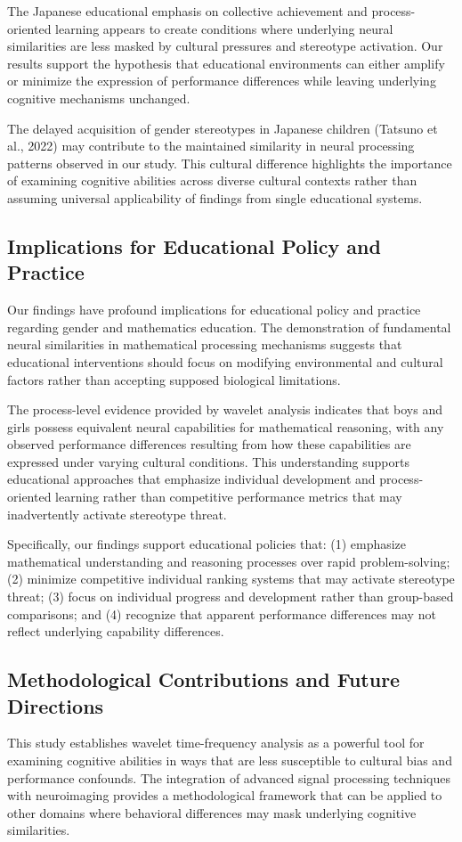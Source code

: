 \documentclass[pdflatex,reference]{sn-jnl}%
\theoremstyle{thmstyleone}%
\theoremstyle{thmstyletwo}%
\theoremstyle{thmstylethree}%
\begin{document}
The Japanese educational emphasis on collective achievement and process-oriented learning appears to create conditions where underlying neural similarities are less masked by cultural pressures and stereotype activation. Our results support the hypothesis that educational environments can either amplify or minimize the expression of performance differences while leaving underlying cognitive mechanisms unchanged.

The delayed acquisition of gender stereotypes in Japanese children (Tatsuno et al., 2022) may contribute to the maintained similarity in neural processing patterns observed in our study. This cultural difference highlights the importance of examining cognitive abilities across diverse cultural contexts rather than assuming universal applicability of findings from single educational systems.


\subsection{Implications for Educational Policy and Practice}
Our findings have profound implications for educational policy and practice regarding gender and mathematics education. The demonstration of fundamental neural similarities in mathematical processing mechanisms suggests that educational interventions should focus on modifying environmental and cultural factors rather than accepting supposed biological limitations.

The process-level evidence provided by wavelet analysis indicates that boys and girls possess equivalent neural capabilities for mathematical reasoning, with any observed performance differences resulting from how these capabilities are expressed under varying cultural conditions. This understanding supports educational approaches that emphasize individual development and process-oriented learning rather than competitive performance metrics that may inadvertently activate stereotype threat.

Specifically, our findings support educational policies that: (1) emphasize mathematical understanding and reasoning processes over rapid problem-solving; (2) minimize competitive individual ranking systems that may activate stereotype threat; (3) focus on individual progress and development rather than group-based comparisons; and (4) recognize that apparent performance differences may not reflect underlying capability differences.


\subsection{Methodological Contributions and Future Directions}
This study establishes wavelet time-frequency analysis as a powerful tool for examining cognitive abilities in ways that are less susceptible to cultural bias and performance confounds. The integration of advanced signal processing techniques with neuroimaging provides a methodological framework that can be applied to other domains where behavioral differences may mask underlying cognitive similarities.
\end{document}
